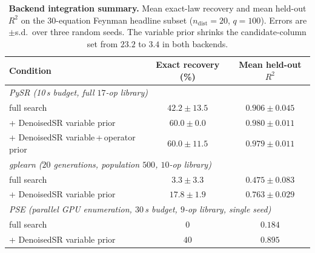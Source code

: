 \documentclass[11pt]{article}
\begin{document}
\begin{table}[h!]\centering
\caption{\textbf{Backend integration summary.} Mean exact-law recovery and mean
held-out $R^2$ on the $30$-equation Feynman headline subset
($n_{\mathrm{dist}}=20$, $q=100$). Errors are $\pm$s.d.\ over three random seeds.
The variable prior shrinks the candidate-column set from $23.2$ to $3.4$ in
both backends.}
\label{tab:backends}
\footnotesize
\begin{tabular}{lcc}
\toprule
Condition & Exact recovery (\%) & Mean held-out $R^2$ \\
\midrule
\multicolumn{3}{l}{\emph{PySR (10\,s budget, full $17$-op library)}} \\
\quad full search                & $42.2 \pm 13.5$ & $0.906 \pm 0.045$ \\
\quad + DenoisedSR variable prior  & $60.0 \pm 0.0$  & $0.980 \pm 0.011$ \\
\quad + DenoisedSR variable\,+\,operator prior & $60.0 \pm 11.5$ & $0.979 \pm 0.011$ \\
\midrule
\multicolumn{3}{l}{\emph{gplearn ($20$ generations, population $500$, $10$-op library)}} \\
\quad full search                & $3.3  \pm 3.3$  & $0.475 \pm 0.083$ \\
\quad + DenoisedSR variable prior  & $17.8 \pm 1.9$  & $0.763 \pm 0.029$ \\
\midrule
\multicolumn{3}{l}{\emph{PSE (parallel GPU enumeration, $30$\,s budget, $9$-op library, single seed)}} \\
\quad full search                & $0$  & $0.184$ \\
\quad + DenoisedSR variable prior  & $40$ & $0.895$ \\
\bottomrule
\end{tabular}
\end{table}
\end{document}
